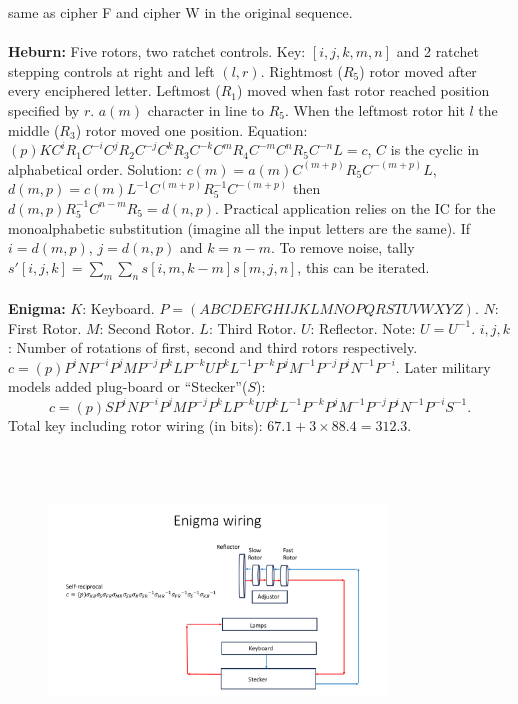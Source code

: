 same as cipher F and cipher W in the original sequence.
\\
\\
{\bf Heburn: } Five rotors, 
two ratchet controls.  Key: $[i,j,k,m,n]$ and 2 ratchet stepping 
controls at right and left $(l, r)$.  Rightmost ($R_5$) rotor moved after
every enciphered 
letter.  Leftmost ($R_1$) moved when fast rotor reached position specified by $r$.  
$a(m)$ character in line to $R_5$.
When the leftmost rotor hit $l$ the middle ($R_3$) rotor moved one position.  Equation:
$(p)K C^iR_1C^{-i} C^j R_2 C^{-j} C^k R_3 C^{-k} C^m R_4 C^{-m} C^n R_5 C^{-n} L=c$,
$C$ is the cyclic in alphabetical order.  Solution: $c(m)= a(m) C^{(m+p)} R_5 C^{-(m+p)}L$,
$d(m,p)= c(m)L^{-1} C^{(m+p)} R_5^{-1} C^{-(m+p)}$ then 
$d(m,p) R_5^{-1} C^{n-m} R_5=d(n,p)$.  Practical application relies on the IC for the
monoalphabetic substitution (imagine all the input letters are the same).  If 
$i=d(m,p)$, $j=d(n,p)$ and $k=n-m$.  To remove noise, tally
$s'[i,j,k]= \sum_m \sum_n s[i, m, k-m] s[m,j,n]$, this can be iterated.
\\
\\
{\bf Enigma: }
$K$: Keyboard.
$P=(ABCDEFGHIJKLMNOPQRSTUVWXYZ)$.
$N$: First Rotor.
$M$: Second Rotor.
$L$: Third Rotor.
$U$: Reflector.  Note: $U=U^{-1}$.
$i,j,k$: Number of rotations of first, second and third rotors respectively.
$c= (p) P^i N P^{-i} P^j M P^{-j} P^k L P^{-k} U P^k L^{-1} P^{-k} P^j M^{-1} P^{-j} P^i N^{-1} P^{-i}$.
Later military models added plug-board or ``Stecker''($S$):
$$c=(p) S P^i N P^{-i} P^jMP^{-j} P^kLP^{-k} U P^kL^{-1}P^{-k} P^jM^{-1}P^{-j} P^iN^{-1}P^{-i}
S^{-1}.$$
Total key including rotor wiring (in bits):
$67.1 + 3 \times 88.4 = 312.3$.
\\
\begin{figure} 
\center
\includegraphics[width=0.8\textwidth,natwidth=642,natheight=610, height=80mm, width=88mm]{Enigma.pdf}
\end{figure}
